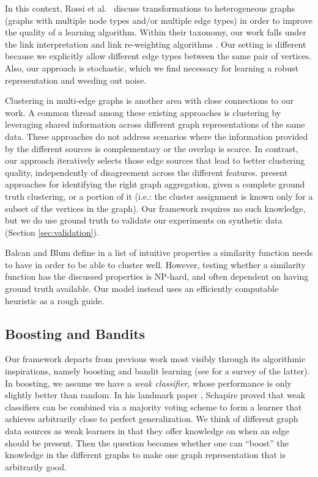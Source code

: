 \documentclass{article}
\begin{document}
In this context, Rossi et al.~\cite{Rossi2012} discuss transformations to
heterogeneous graphs (graphs with multiple node types and/or multiple edge
types) in order to improve the quality of a learning algorithm. Within their
taxonomy, our work falls under the link interpretation and link re-weighting
algorithms \cite{Xiang2010,Gilbert2009}. Our setting is different because we
explicitly allow different edge types between the same pair of vertices. Also,
our approach is stochastic, which we find necessary for learning a robust
representation and weeding out noise. 

Clustering in multi-edge graphs
\cite{Papalexakis2013,Tang2009,Tang2012,Mucha2010,Berlingerio2011} is another
area with close connections to our work. A common thread among these existing
approaches is clustering by leveraging shared information across different
graph representations of the same data. These approaches do not address
scenarios where the information provided by the different sources is
complementary or the overlap is scarce. In contrast, our approach iteratively
selects those edge sources that lead to better clustering quality,
independently of disagreement across the different features.
\cite{Rocklin2013,Cai2005} present approaches for identifying the right graph
aggregation, given a complete ground truth clustering, or a portion of it
(i.e.: the cluster assignment is known only for a subset of the vertices in the
graph). Our framework requires no such knowledge, but we do use ground truth to
validate our experiments on synthetic data (Section \ref{sec:validation}). 

Balcan and Blum define in \cite{Balcan2006,Balcan2008} a list of intuitive
properties a similarity function needs to have in order to be able to cluster
well. However, testing whether a similarity function has the discussed
properties is NP-hard, and often dependent on having ground truth available.
Our model instead uses an efficiently computable heuristic as a rough guide.

\subsection{Boosting and Bandits}
Our framework departs from previous work most visibly through its algorithmic
inspirations, namely boosting \cite{Schapire90} and bandit learning (see
\cite{Bubeck12} for a survey of the latter). In boosting, we assume we have a
{\em weak classifier}, whose performance is only slightly better than random.
In his landmark paper \cite{Schapire90}, Schapire proved that weak classifiers
can be combined via a majority voting scheme to form a learner that achieves
arbitrarily close to perfect generalization. We think of different graph data
sources as weak learners in that they offer knowledge on when an edge should be
present. Then the question becomes whether one can ``boost'' the knowledge in
the different graphs to make one graph representation that is arbitrarily good.
\end{document}
